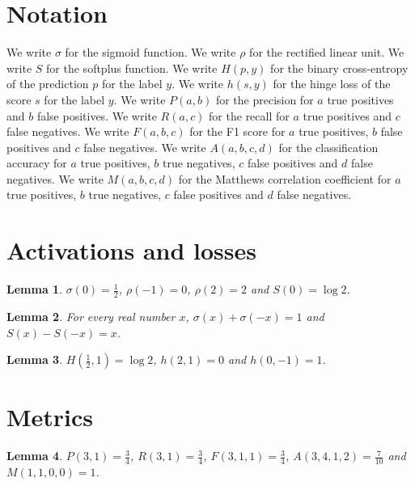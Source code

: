 \documentclass{article}
\newtheorem{lemma}{Lemma}
\begin{document}
\section{Notation}

We write $\sigma$ for the sigmoid function.
We write $\rho$ for the rectified linear unit.
We write $S$ for the softplus function.
We write $H(p,y)$ for the binary cross-entropy of the prediction $p$ for the label $y$.
We write $h(s,y)$ for the hinge loss of the score $s$ for the label $y$.
We write $P(a,b)$ for the precision for $a$ true positives and $b$ false positives.
We write $R(a,c)$ for the recall for $a$ true positives and $c$ false negatives.
We write $F(a,b,c)$ for the F1 score for $a$ true positives, $b$ false positives and $c$ false negatives.
We write $A(a,b,c,d)$ for the classification accuracy for $a$ true positives, $b$ true negatives, $c$ false positives and $d$ false negatives.
We write $M(a,b,c,d)$ for the Matthews correlation coefficient for $a$ true positives, $b$ true negatives, $c$ false positives and $d$ false negatives.

\section{Activations and losses}

\begin{lemma}\label{activations}
$\sigma(0)=\frac12$, $\rho(-1)=0$, $\rho(2)=2$ and $S(0)=\log2$.
\end{lemma}

\begin{lemma}\label{symmetry}
For every real number $x$, $\sigma(x)+\sigma(-x)=1$ and $S(x)-S(-x)=x$.
\end{lemma}

\begin{lemma}\label{losses}
$H(\frac12,1)=\log2$, $h(2,1)=0$ and $h(0,-1)=1$.
\end{lemma}

\section{Metrics}

\begin{lemma}\label{metrics}
$P(3,1)=\frac34$, $R(3,1)=\frac34$, $F(3,1,1)=\frac34$, $A(3,4,1,2)=\frac{7}{10}$ and $M(1,1,0,0)=1$.
\end{lemma}
\end{document}
